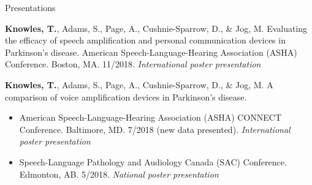 \documentclass{resume} %
\begin{document}
\begin{rSection}{Presentations}
\begin{etaremune}
\item {\bf Knowles, T.}, Adams, S., Page, A., Cushnie-Sparrow, D., \& Jog, M. Evaluating the efficacy of speech amplification and personal communication devices in Parkinson's disease. American Speech-Language-Hearing Association (ASHA) Conference. Boston, MA. 11/2018. \emph{International poster presentation}
	
\item {\bf Knowles, T.}, Adams, S., Page, A., Cushnie-Sparrow, D., \& Jog, M. A comparison of voice amplification devices in Parkinson's disease. 
		\begin{itemize}
			\renewcommand\labelitemi{$\cdot$}
			\item American Speech-Language-Hearing Association (ASHA) CONNECT Conference. Baltimore, MD. 7/2018 (new data presented). \emph{International poster presentation}
			\item Speech-Language Pathology and Audiology Canada (SAC) Conference. Edmonton, AB. 5/2018. \emph{National poster presentation}
		\end{itemize}
	

	
	

\end{etaremune}
\end{rSection}
\end{document}
